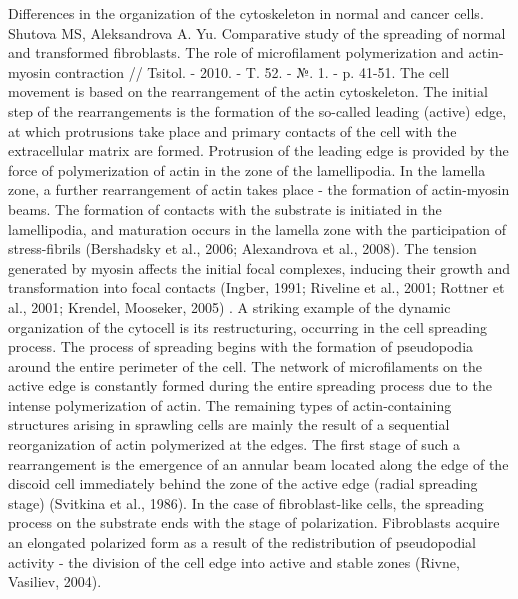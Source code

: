 \documentclass[a4paper,12pt]{article}
\begin{document}
Differences in the organization of the cytoskeleton in normal and cancer cells. Shutova MS, Aleksandrova A. Yu. Comparative study of the spreading of normal and transformed fibroblasts. The role of microfilament polymerization and actin-myosin contraction // Tsitol. - 2010. - T. 52. - №. 1. - p. 41-51.
The cell movement is based on the rearrangement of the actin cytoskeleton. The initial step of the rearrangements is the formation of the so-called leading (active) edge, at which protrusions take place and primary contacts of the cell with the extracellular matrix are formed. Protrusion of the leading edge is provided by the force of polymerization of actin in the zone of the lamellipodia. In the lamella zone, a further rearrangement of actin takes place - the formation of actin-myosin beams. The formation of contacts with the substrate is initiated in the lamellipodia, and maturation occurs in the lamella zone with the participation of stress-fibrils (Bershadsky et al., 2006; Alexandrova et al., 2008). The tension generated by myosin affects the initial focal complexes, inducing their growth and transformation into focal contacts (Ingber, 1991; Riveline et al., 2001; Rottner et al., 2001; Krendel, Mooseker, 2005) .
A striking example of the dynamic organization of the cytocell is its restructuring, occurring in the cell spreading process. The process of spreading begins with the formation of pseudopodia around the entire perimeter of the cell. The network of microfilaments on the active edge is constantly formed during the entire spreading process due to the intense polymerization of actin. The remaining types of actin-containing structures arising in sprawling cells are mainly the result of a sequential reorganization of actin polymerized at the edges. The first stage of such a rearrangement is the emergence of an annular beam located along the edge of the discoid cell immediately behind the zone of the active edge (radial spreading stage) (Svitkina et al., 1986). In the case of fibroblast-like cells, the spreading process on the substrate ends with the stage of polarization. Fibroblasts acquire an elongated polarized form as a result of the redistribution of pseudopodial activity - the division of the cell edge into active and stable zones (Rivne, Vasiliev, 2004).
\end{document}
